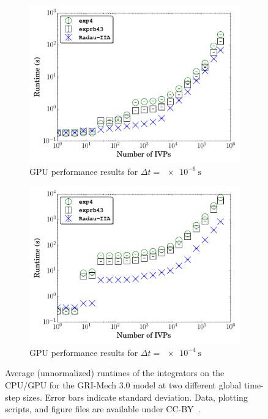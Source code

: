 \documentclass[11pt]{scrartcl}
\begin{document}
\begin{figure}[htbp]
\begin{subfigure}{0.49\textwidth}
      \includegraphics[width=\linewidth]{CH4_1e-06_gpu_nonorm.pdf}
      \caption{GPU performance results for $\Delta t = \SI{e-6}{\second}$}
  \end{subfigure}
  \begin{subfigure}{0.49\textwidth}
      \includegraphics[width=\linewidth]{CH4_1e-04_gpu_nonorm.pdf}
      \caption{GPU performance results for $\Delta t = \SI{e-4}{\second}$}
  \end{subfigure}
  \caption{Average (unnormalized) runtimes of the integrators on the CPU\slash GPU for the GRI-Mech 3.0 model at two different global time-step sizes.
  Error bars indicate standard deviation.
  Data, plotting scripts, and figure files are available under CC-BY~\cite{paperscript:2017}.}
  \label{F:raw_perf_CH4}
\end{figure}
\end{document}
